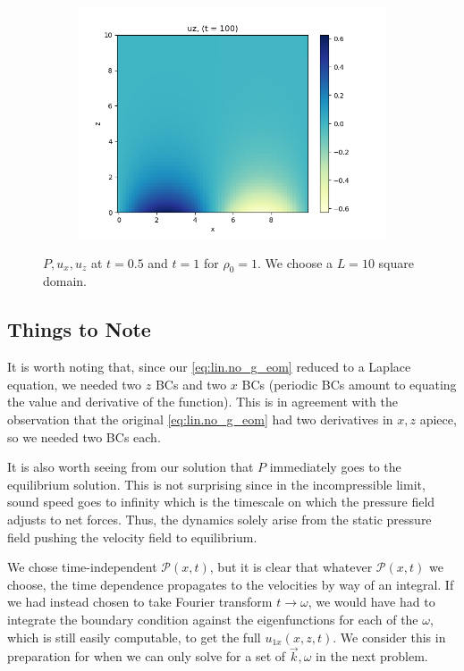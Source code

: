 \documentclass[11pt,
        usenames, %
        dvipsnames %
    ]{report}
\begin{document}
\begin{figure}[!h]
\begin{subfigure}{0.3\textwidth}
        \includegraphics[width=\textwidth]{../sims_old/2d_0_no_g/no_g_uz_t100.png}
    \end{subfigure}
    \caption{$P, u_x, u_z$ at $t = 0.5$ and $t = 1$ for $\rho_0 = 1$. We choose
    a $L = 10$ square domain.}\label{fig:no_g}
\end{figure}

\subsection{Things to Note}

It is worth noting that, since our \autoref{eq:lin.no_g_eom} reduced to a Laplace
equation, we needed two $z$ BCs and two $x$ BCs (periodic BCs amount to equating
the value and derivative of the function). This is in agreement with the
observation that the original \autoref{eq:lin.no_g_eom} had two derivatives in
$x, z$ apiece, so we needed two BCs each.

It is also worth seeing from our solution that $P$ immediately goes to the
equilibrium solution. This is not surprising since in the incompressible limit,
sound speed goes to infinity which is the timescale on which the pressure field
adjusts to net forces. Thus, the dynamics solely arise from the static pressure
field pushing the velocity field to equilibrium.

We chose time-independent $\mathcal{P}(x, t)$, but it is clear that whatever
$\mathcal{P}(x, t)$ we choose, the time dependence propagates to the velocities
by way of an integral. If we had instead chosen to take Fourier transform $t \to
\omega$, we would have had to integrate the boundary condition against the
eigenfunctions for each of the $\omega$, which is still easily computable, to
get the full $u_{1x}(x, z, t)$. We consider this in preparation for when we can
only solve for a set of $\vec{k}, \omega$ in the next problem.
\end{document}
